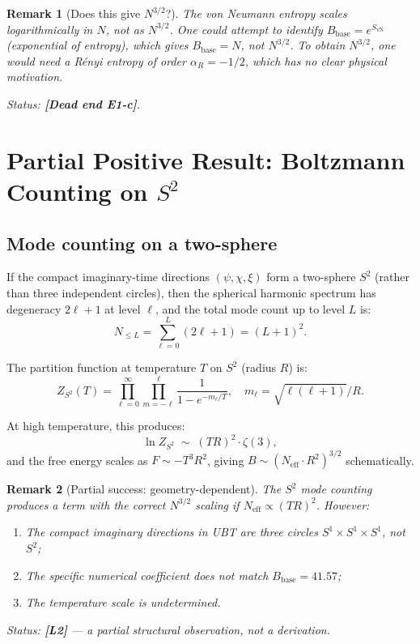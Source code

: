 \documentclass[11pt,a4paper]{article}
\newtheorem{remark}{Remark}
\begin{document}
\begin{remark}[Does this give $N^{3/2}$?]
  The von Neumann entropy scales logarithmically in $N$, not as $N^{3/2}$.
  One could attempt to identify $B_{\mathrm{base}} = e^{S_{\mathrm{vN}}}$
  (exponential of entropy), which gives $B_{\mathrm{base}} = N$, not $N^{3/2}$.
  To obtain $N^{3/2}$, one would need a \emph{Rényi entropy} of order
  $\alpha_R = -1/2$, which has no clear physical motivation.

  Status: \textbf{[Dead end E1-c]}.
\end{remark}

\section{Partial Positive Result: Boltzmann Counting on $S^2$}
\label{sec:s2}

\subsection{Mode counting on a two-sphere}

If the compact imaginary-time directions $(\psi, \chi, \xi)$ form a two-sphere
$S^2$ (rather than three independent circles), then the spherical harmonic
spectrum has degeneracy $2\ell+1$ at level $\ell$, and the total mode count
up to level $L$ is:
\begin{equation}
  N_{\leq L} = \sum_{\ell=0}^L (2\ell+1) = (L+1)^2.
\end{equation}

The partition function at temperature $T$ on $S^2$ (radius $R$) is:
\begin{equation}
  Z_{S^2}(T) = \prod_{\ell=0}^{\infty} \prod_{m=-\ell}^{\ell}
  \frac{1}{1 - e^{-m_{\ell}/T}}, \quad
  m_\ell = \sqrt{\ell(\ell+1)}/R.
\end{equation}

At high temperature, this produces:
\begin{equation}
  \ln Z_{S^2} \;\sim\; (TR)^2 \cdot \zeta(3),
\end{equation}
and the free energy scales as $F \sim -T^3 R^2$, giving
$B \sim (N_{\mathrm{eff}} \cdot R^2)^{3/2}$ schematically.

\begin{remark}[Partial success: geometry-dependent]
  The $S^2$ mode counting produces a term with the correct $N^{3/2}$ scaling
  \emph{if} $N_{\mathrm{eff}} \propto (TR)^2$.  However:
  \begin{enumerate}
    \item The compact imaginary directions in UBT are three circles
          $S^1 \times S^1 \times S^1$, not $S^2$;
    \item The specific numerical coefficient does not match $B_{\mathrm{base}} = 41.57$;
    \item The temperature scale is undetermined.
  \end{enumerate}
  Status: \textbf{[L2]} — a partial structural observation, not a derivation.
\end{remark}
\end{document}
